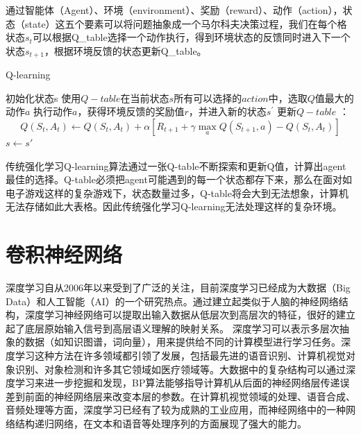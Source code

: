 通过智能体（Agent）、环境（environment）、奖励（reward）、动作（action），状态（state）这五个要素可以将问题抽象成一个马尔科夫决策过程，我们在每个格状态$s_t$可以根据Q\_table选择一个动作执行，得到环境状态的反馈同时进入下一个状态$s_{t+1}$，根据环境反馈的状态更新Q\_table。
\cleardoublepage
\begin{algorithm}
  \caption{Q-learning}
  \label{Q-learning}
  \begin{algorithmic}[1]
    \State 初始化状态s
    \State 使用$Q-table$在当前状态$s$所有可以选择的$action$中，选取$Q$值最大的动作$a$
    \State 执行动作$a$，获得环境反馈的奖励值$r$，并进入新的状态$s^{'}$
    \State 更新$Q-table$ ： $$Q\left(S_{t}, A_{t}\right) \leftarrow Q\left(S_{t}, A_{t}\right)+\alpha\left[R_{t+1}+\gamma \max _{a} Q\left(S_{t+1}, a\right)-Q\left(S_{t}, A_{t}\right)\right]$$
    \State $s \gets s'$
    \EndFor
    \EndFor
  \end{algorithmic}
\end{algorithm}

传统强化学习Q-learning算法通过一张Q-table不断探索和更新Q值，计算出agent最佳的选择。Q-table必须把agent可能遇到的每一个状态都存下来，那么在面对如电子游戏这样的复杂游戏下，状态数量过多，Q-table将会大到无法想象，计算机无法存储如此大表格。因此传统强化学习Q-learning无法处理这样的复杂环境。
\section{卷积神经网络}
深度学习自从2006年以来受到了广泛的关注，目前深度学习已经成为大数据（Big Data）和人工智能（AI）的一个研究热点。通过建立起类似于人脑的神经网络结构，深度学习神经网络可以提取出输入数据从低层次到高层次的特征，很好的建立起了底层原始输入信号到高层语义理解的映射关系。
深度学习可以表示多层次抽象的数据（如知识图谱，词向量），用来提供给不同的计算模型进行学习任务。深度学习这种方法在许多领域都引领了发展，包括最先进的语音识别、计算机视觉对象识别、对象检测和许多其它领域如医疗领域等。大数据中的复杂结构可以通过深度学习来进一步挖掘和发现，BP算法能够指导计算机从后面的神经网络层传递误差到前面的神经网络层来改变本层的参数。在计算机视觉领域的处理、语音合成、音频处理等方面，深度学习已经有了较为成熟的工业应用，而神经网络中的一种网络结构递归网络，在文本和语音等处理序列的方面展现了强大的能力。
